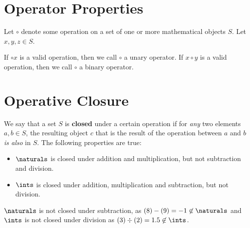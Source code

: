 \newcommand{\op}{\circ}

\section{Operator Properties}
Let $\op$ denote some operation on a set of one or more mathematical
objects $S$. Let $x, y, z \in S$.

If $\op x$ is a valid operation, then we call $\op$ a unary operator. If
$x \op y$ is a valid operation, then we call $\op$ a binary operator.





\section{Operative Closure}
We say that a set $S$ is \textbf{closed} under a certain operation if for
\emph{any} two elements $a, b \in S$, the resulting object $c$ that is the
result of the operation between $a$ and $b$ \emph{is also} in $S$. The
following properties are true:

\begin{itemize}
  \item $\naturals$ is closed under addition and multiplication, but not
  subtraction and division.
  \item $\ints$ is closed under addition, multiplication and subtraction, but
  not division.
\end{itemize}

$\naturals$ is not closed under subtraction, as
$(8) - (9) = -1 \not \in \naturals$ and $\ints$ is not closed under division
as $(3) \div (2) = 1.5 \not\in \ints$.
